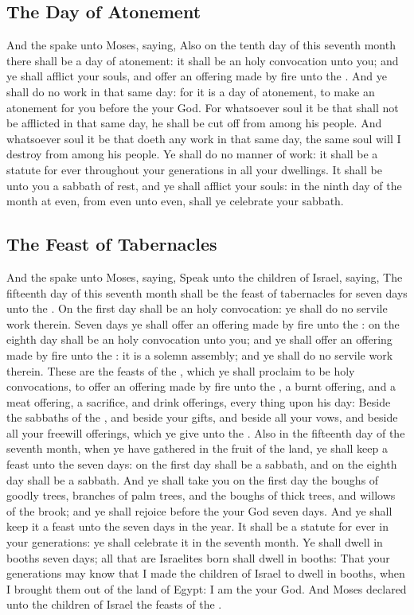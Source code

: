 \begin{biblechapter}
\subsection*{The Day of Atonement}
\verse And the \LORD spake unto Moses, saying,
\verse Also on the tenth day of this seventh month there shall be a day of atonement: it shall be an holy convocation unto you; and ye shall afflict your souls, and offer an offering made by fire unto the \LORD.
\verse And ye shall do no work in that same day: for it is a day of atonement, to make an atonement for you before the \LORD your God.
\verse For whatsoever soul it be that shall not be afflicted in that same day, he shall be cut off from among his people.
\verse And whatsoever soul it be that doeth any work in that same day, the same soul will I destroy from among his people.
\verse Ye shall do no manner of work: it shall be a statute for ever throughout your generations in all your dwellings.
\verse It shall be unto you a sabbath of rest, and ye shall afflict your souls: in the ninth day of the month at even, from even unto even, shall ye celebrate your sabbath.
\subsection*{The Feast of Tabernacles}
\verse And the \LORD spake unto Moses, saying,
\verse Speak unto the children of Israel, saying, The fifteenth day of this seventh month shall be the feast of tabernacles for seven days unto the \LORD.
\verse On the first day shall be an holy convocation: ye shall do no servile work therein.
\verse Seven days ye shall offer an offering made by fire unto the \LORD: on the eighth day shall be an holy convocation unto you; and ye shall offer an offering made by fire unto the \LORD: it is a solemn assembly; and ye shall do no servile work therein.
\verse These are the feasts of the \LORD, which ye shall proclaim to be holy convocations, to offer an offering made by fire unto the \LORD, a burnt offering, and a meat offering, a sacrifice, and drink offerings, every thing upon his day:
\verse Beside the sabbaths of the \LORD, and beside your gifts, and beside all your vows, and beside all your freewill offerings, which ye give unto the \LORD.
\verse Also in the fifteenth day of the seventh month, when ye have gathered in the fruit of the land, ye shall keep a feast unto the \LORD seven days: on the first day shall be a sabbath, and on the eighth day shall be a sabbath.
\verse And ye shall take you on the first day the boughs of goodly trees, branches of palm trees, and the boughs of thick trees, and willows of the brook; and ye shall rejoice before the \LORD your God seven days.
\verse And ye shall keep it a feast unto the \LORD seven days in the year. It shall be a statute for ever in your generations: ye shall celebrate it in the seventh month.
\verse Ye shall dwell in booths seven days; all that are Israelites born shall dwell in booths:
\verse That your generations may know that I made the children of Israel to dwell in booths, when I brought them out of the land of Egypt: I am the \LORD your God.
\verse And Moses declared unto the children of Israel the feasts of the \LORD.
\end{biblechapter}

